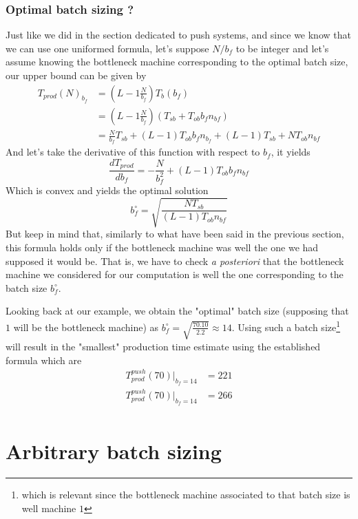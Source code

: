 \subsubsection{Optimal batch sizing ?}

Just like we did in the section dedicated to push systems, and since we know that we can use one uniformed formula, let's suppose $N/b_f$ to be integer and let's assume knowing the bottleneck machine corresponding to the optimal batch size, our upper bound can be given by \[
    \begin{split}
        T_{prod}(N)_{b_f} &= \left(L - 1 \frac{N}{b_f}\right)T_b(b_f) \\
        &= \left(L-1\frac{N}{b_f}\right) ( T_{sb} + T_{ob}b_fn_{bf} ) \\
        &= \frac{N}{b_f}T_{sb} + (L-1)T_{ob}b_fn_{b_f} + (L-1)T_{sb} + NT_{ob}n_{bf}
    \end{split}
\]
And let's take the derivative of this function with respect to $b_f$, it yields 
\[
    \frac{dT_{prod}}{db_f} = -\frac{N}{b_f^2} + (L-1)T_{ob}b_fn_{bf}
\]
Which is convex and yields the optimal solution \[ b_f^\circ = \sqrt{ \frac{NT_{sb}}{ (L-1)T_{ob}n_{bf} } } \]
But keep in mind that, similarly to what have been said in the previous section, this formula holds only if the bottleneck machine was well the one we had supposed it would be. That is, we have to check \textit{a posteriori} that the bottleneck machine we considered for our computation is well the one corresponding to the batch size $b_f^\circ$. 

Looking back at our example, we obtain the "optimal" batch size (supposing that $1$ will be the bottleneck machine) as $b_f^\circ = \sqrt{ \frac{70.10}{2.2} } \approx 14$. Using such a batch size\footnote{which is relevant since the bottleneck machine associated to that batch size is well machine $1$} will result in the "smallest" production time estimate using the established formula which are \[
    \begin{split}
    T_{prod}^{push}(70)|_{b_f = 14} &= 221\\
    T_{prod}^{push}(70)|_{b_f = 14} &= 266\\
    \end{split}
    \]

\section{Arbitrary batch sizing}

